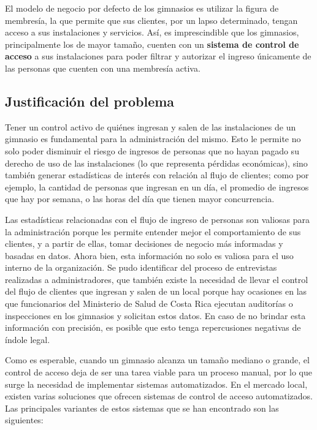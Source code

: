  El modelo de negocio por defecto de los gimnasios es utilizar la figura de membresía, la que permite que sus clientes, por un lapso determinado, tengan acceso a sus instalaciones y servicios. Así, es imprescindible que los gimnasios, principalmente los de mayor tamaño, cuenten con un \textbf{sistema de control de acceso} a sus instalaciones para poder filtrar y autorizar el ingreso únicamente de las personas que cuenten con una membresía activa. 
 
 \subsection{Justificación del problema}
 
 Tener un control activo de quiénes ingresan y salen de las instalaciones de un gimnasio es fundamental para la administración del mismo. Esto le permite no solo poder disminuir el riesgo de ingresos de personas que no hayan pagado su derecho de uso de las instalaciones (lo que representa pérdidas económicas), sino también generar estadísticas de interés con relación al flujo de clientes; como por ejemplo, la cantidad de personas que ingresan en un día, el promedio de ingresos que hay por semana, o las horas del día que tienen mayor concurrencia.

 Las estadísticas relacionadas con el flujo de ingreso de personas son valiosas para la administración porque les permite entender mejor el comportamiento de sus clientes, y a partir de ellas, tomar decisiones de negocio más informadas y basadas en datos. Ahora bien, esta información no solo es valiosa para el uso interno de la organización. Se pudo identificar del proceso de entrevistas realizadas a administradores, que también existe la necesidad de llevar el control del flujo de clientes que ingresan y salen de un local porque hay ocasiones en las que funcionarios del Ministerio de Salud de Costa Rica ejecutan auditorías o inspecciones en los gimnasios y solicitan estos datos. En caso de no brindar esta información con precisión, es posible que esto tenga repercusiones negativas de índole legal.
 
 Como es esperable, cuando un gimnasio alcanza un tamaño mediano o grande, el control de acceso deja de ser una tarea viable para un proceso manual, por lo que surge la necesidad de implementar sistemas automatizados. En el mercado local, existen varias soluciones que ofrecen sistemas de control de acceso automatizados. Las principales variantes de estos sistemas que se han encontrado son las siguientes:
 
